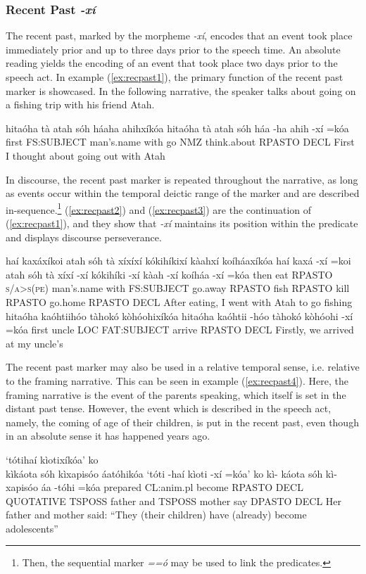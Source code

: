 \documentclass[a4paper, 12pt, oneside]{memoir}
\newcommand{\emh}[1]{\textit{#1}}
\begin{document}
\subsubsection{Recent Past \emh{-xí}}\label{s:recpast}
The recent past, marked by the morpheme \emh{-xí}, encodes that an event took place immediately prior and up to three days prior to the speech time. An absolute reading yields the encoding of an event that took place two days prior to the speech act. In example (\ref{ex:recpast1}), the primary function of the recent past marker is showcased. In the following narrative, the speaker talks about going on a fishing trip with his friend Atah.
\begin{examples}
    \ex \label{ex:recpast1}
    \words hitaóha tà atah sóh háaha ahihxíkóa
    \bits hitaóha tà atah sóh háa -ha ahih -xí =kóa
    \gloss first FS:SUBJECT man's.name with go NMZ think.about RPASTO DECL
    \tr First I thought about going out with Atah
\end{examples}
In discourse, the recent past marker is repeated throughout the narrative, as long as events occur within the temporal deictic range of the marker and are described in-sequence.\footnote{Then, the sequential marker \emh{==ó} may be used to link the predicates.} (\ref{ex:recpast2}) and (\ref{ex:recpast3}) are the continuation of (\ref{ex:recpast1}), and they show that \emh{-xí} maintains its position within the predicate and displays discourse perseverance.
\begin{examples}
    \ex \label{ex:recpast2}
    \words haí kaxáxíkoi atah sóh tà xíxíxí kókihíkixí kàahxí koíháaxíkóa
    \bits haí kaxá -xí =koi atah sóh tà xíxí -xí kókihíki -xí kàah -xí koíháa -xí =kóa  
    \gloss then eat RPASTO \textsc{\textup{s/a>s(pe)}} man's.name with FS:SUBJECT go.away RPASTO fish RPASTO kill RPASTO go.home RPASTO DECL
    \tr After eating, I went with Atah to go fishing
    \ex \label{ex:recpast3}
    \words hitaóha kaóhtiihóo tàhokó kòhóohixíkóa
    \bits hitaóha kaóhtii -hóo tàhokó kòhóohi -xí =kóa 
    \gloss first uncle LOC FAT:SUBJECT arrive RPASTO DECL
    \tr Firstly, we arrived at my uncle's
\end{examples}
The recent past marker may also be used in a relative temporal sense, i.e. relative to the framing narrative. This can be seen in example (\ref{ex:recpast4}). Here, the framing narrative is the event of the parents speaking, which itself is set in the distant past tense. However, the event which is described in the speech act, namely, the coming of age of their children, is put in the recent past, even though in an absolute sense it has happened years ago.
\begin{examples}
    \ex \label{ex:recpast4}
    \words `tótihaí kìotixíkóa' ko \\ kìkáota sóh kìxapisóo áatóhikóa
    \bits `tóti -haí kìoti -xí =kóa' ko kì- káota sóh kì- xapisóo áa -tóhi =kóa
    \gloss prepared CL:anim.pl become RPASTO DECL QUOTATIVE TSPOSS father and TSPOSS mother say DPASTO DECL
    \tr Her father and mother said: ``They (their children) have (already) become adolescents''
\end{examples}
\end{document}

